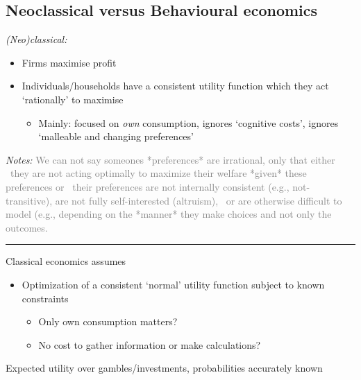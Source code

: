 \documentclass[]{article}
\providecommand{\tightlist}{%
  \setlength{\itemsep}{0pt}\setlength{\parskip}{0pt}}
\begin{document}
\hypertarget{neoclassical-versus-behavioural-economics}{%
\subsection{Neoclassical versus Behavioural
economics}\label{neoclassical-versus-behavioural-economics}}

\emph{(Neo)classical:}

\begin{itemize}
\tightlist
\item
  Firms maximise profit
\item
  Individuals/households have a consistent utility function which they
  act `rationally' to maximise

  \begin{itemize}
  \tightlist
  \item
    Mainly: focused on \emph{own} consumption, ignores `cognitive
    costs', ignores `malleable and changing preferences'
  \end{itemize}
\end{itemize}

\emph{Notes:}
\textcolor{gray}{We can not say someones *preferences* are irrational, only that either \
they are not acting optimally to maximize their welfare *given* these preferences or \
their preferences are not internally consistent (e.g., not-transitive), are not fully self-interested (altruism), \
 or are otherwise difficult to model (e.g., depending on the *manner* they make choices and not only the outcomes.}

\begin{center}\rule{0.5\linewidth}{\linethickness}\end{center}

Classical economics assumes

\begin{itemize}
\tightlist
\item
  Optimization of a consistent `normal' utility function subject to
  known constraints

  \begin{itemize}
  \tightlist
  \item
    Only own consumption matters?
  \item
    No cost to gather information or make calculations?
  \end{itemize}
\end{itemize}

\bigskip

Expected utility over gambles/investments, probabilities accurately
known
\end{document}
